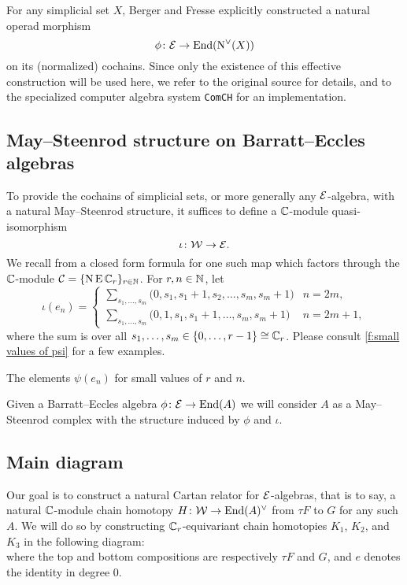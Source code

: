 For any simplicial set $X$, Berger and Fresse explicitly constructed a natural operad morphism
\[
\phi \colon \mathcal{E} \to \mathrm{End}(\operatorname{N^{\vee}}(X))
\]
on its (normalized) cochains.
Since only the existence of this effective construction will be used here, we refer to the original source for details, and to the specialized computer algebra system \texttt{ComCH} for an implementation.

\subsection{May--Steenrod structure on Barratt--Eccles algebras}

To provide the cochains of simplicial sets, or more generally any $\mathcal{E}$-algebra, with a natural May--Steenrod structure, it suffices to define a $\mathbb{C}$-module quasi-isomorphism
\[
\iota \colon \mathcal{W} \to \mathcal{E}.
\]
We recall from \cite{medina2021may_st} a closed form formula for one such map which factors through the $\mathbb{C}$-module $\mathcal{C} = \{\operatorname{N}\operatorname{E}\mathbb{C}_r\}_{r\in\mathbb{N}}$.
For $r,n\in\mathbb{N}$, let
\begin{equation*}
	\iota(e_{n}) =
	\begin{cases}
		\displaystyle{\sum_{s_1, \dots, s_m}} \big(0, {s_1}, {s_1+1}, {s_2}, \dots, {s_{m}}, {s_{m}+1} \big) & n = 2m, \\
		\displaystyle{\sum_{s_1, \dots, s_m}} \big(0, 1, {s_1}, {s_1+1}, \dots, {s_{m}}, {s_{m}+1} \big) & n = 2m+1,
	\end{cases}
\end{equation*}
where the sum is over all $s_1, \dots, s_m \in \{0, \dots, r-1\} \cong \mathbb{C}_r$.
Please consult \cref{f:small values of psi} for a few examples.

\begin{table}
	\centering
	
	\caption{The elements $\psi(e_n)$ for small values of $r$ and $n$.}
	\label{f:small values of psi}
\end{table}

Given a Barratt--Eccles algebra $\phi \colon \mathcal{E} \to \mathrm{End}(A)$ we will consider $A$ as a May--Steenrod complex with the structure induced by $\phi$ and $\iota$.

\subsection{Main diagram}

Our goal is to construct a natural Cartan relator for $\mathcal{E}$-algebras, that is to say, a natural $\mathbb{C}$-module chain homotopy $H \colon \mathcal{W} \to \mathrm{End}(A)^\vee$ from $\tau F$ to $G$ for any such $A$.
We will do so by constructing $\mathbb{C}_r$-equivariant chain homotopies $K_1$, $K_2$, and $K_3$ in the following diagram:
\begin{equation}\label{d:big diagram}
	
\end{equation}
where the top and bottom compositions are respectively $\tau F$ and $G$, and $e$ denotes the identity in degree $0$.

